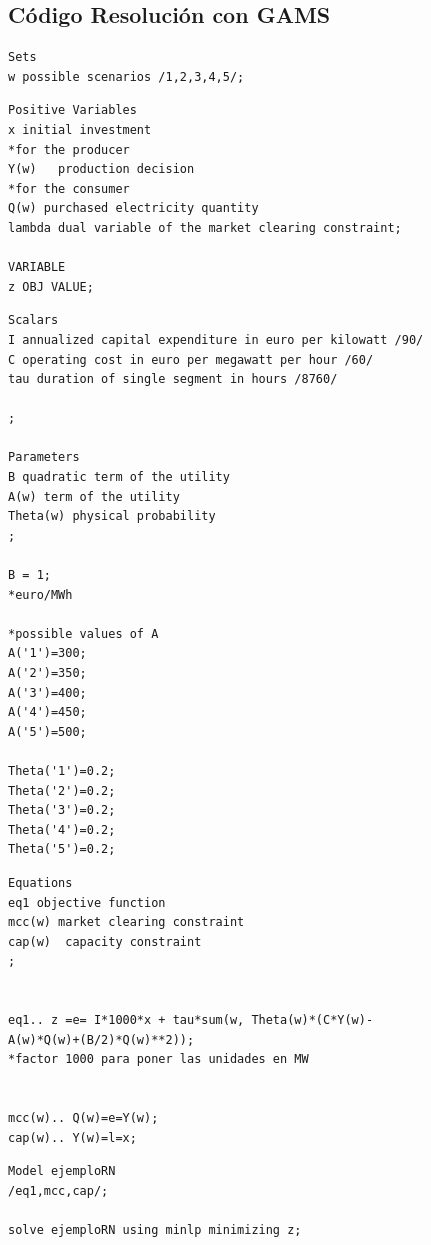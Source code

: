 \subsection{Código Resolución con GAMS}\label{codigoresoluciongams}
\begin{footnotesize}

\begin{lstlisting}
Sets
w possible scenarios /1,2,3,4,5/;
\end{lstlisting}

\begin{lstlisting}
Positive Variables
x initial investment
*for the producer
Y(w)   production decision
*for the consumer
Q(w) purchased electricity quantity
lambda dual variable of the market clearing constraint;

VARIABLE
z OBJ VALUE;   
\end{lstlisting}

\begin{lstlisting}
Scalars
I annualized capital expenditure in euro per kilowatt /90/
C operating cost in euro per megawatt per hour /60/
tau duration of single segment in hours /8760/

;

Parameters
B quadratic term of the utility
A(w) term of the utility
Theta(w) physical probability
;

B = 1;
*euro/MWh 

*possible values of A
A('1')=300;
A('2')=350;
A('3')=400;
A('4')=450;
A('5')=500;

Theta('1')=0.2;
Theta('2')=0.2;
Theta('3')=0.2;
Theta('4')=0.2;
Theta('5')=0.2;
\end{lstlisting}

\begin{lstlisting}
Equations
eq1 objective function
mcc(w) market clearing constraint
cap(w)  capacity constraint
;


eq1.. z =e= I*1000*x + tau*sum(w, Theta(w)*(C*Y(w)-
A(w)*Q(w)+(B/2)*Q(w)**2));
*factor 1000 para poner las unidades en MW


mcc(w).. Q(w)=e=Y(w);
cap(w).. Y(w)=l=x;   
\end{lstlisting}

\begin{lstlisting}
Model ejemploRN
/eq1,mcc,cap/;

solve ejemploRN using minlp minimizing z;    
\end{lstlisting}
\end{footnotesize}

